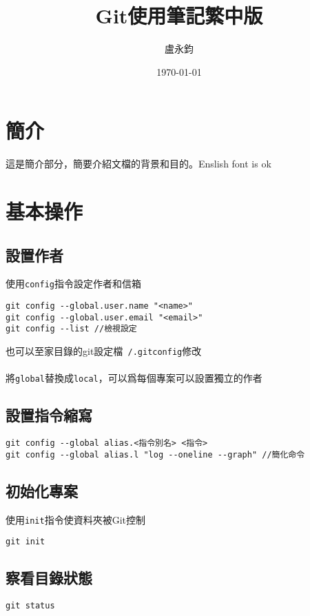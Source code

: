 \documentclass{article}
\title{Git使用筆記繁中版}
\author{盧永鈞}
\date{\today}
\begin{document}
	
\maketitle %

	
	
\tableofcontents %
	
\section{簡介}
這是簡介部分，簡要介紹文檔的背景和目的。Enslish font is ok

\section{基本操作}
\subsection{設置作者}
使用\texttt{config}指令設定作者和信箱
\begin{lstlisting}[language=git]
git config --global.user.name "<name>"
git config --global.user.email "<email>"
git config --list //檢視設定
\end{lstlisting}
也可以至家目錄的git設定檔\texttt{~/.gitconfig}修改
\\\\
將\texttt{global}替換成\texttt{local}，可以爲每個專案可以設置獨立的作者
\subsection{設置指令縮寫}
\begin{lstlisting}[language=git]
git config --global alias.<指令別名> <指令>
git config --global alias.l "log --oneline --graph" //簡化命令
\end{lstlisting}
\subsection{初始化專案}
使用\texttt{init}指令使資料夾被Git控制
\begin{lstlisting}[language=git]
git init
\end{lstlisting}
\subsection{察看目錄狀態}
\begin{lstlisting}[language=git]
git status
\end{lstlisting}
\end{document}
